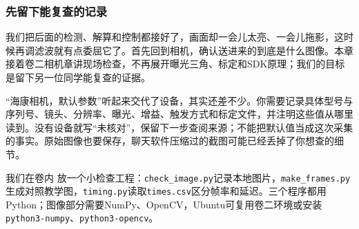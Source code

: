 \subsubsection{先留下能复查的记录}

我们把后面的检测、解算和控制都接好了，画面却一会儿太亮、一会儿拖影，这时候再调滤波就有点委屈它了。首先回到相机，确认送进来的到底是什么图像。本章接着卷二相机章讲现场检查，不再展开曝光三角、标定和SDK原理；我们的目标是留下另一位同学能复查的证据。

“海康相机，默认参数”听起来交代了设备，其实还差不少。你需要记录具体型号与序列号、镜头、分辨率、曝光、增益、触发方式和标定文件，并注明这些值从哪里读到。没有设备就写“未核对”，保留下一步查阅来源；不能把默认值当成这次采集的事实。原始图像也要保存，聊天软件压缩过的截图可能已经丢掉了你想查的细节。

我们在卷内  放一个小检查工程：\texttt{check\_image.py}记录本地图片，\texttt{make\_frames.py}生成对照教学图，\texttt{timing.py}读取\texttt{times.csv}区分帧率和延迟。三个程序都用Python；图像部分需要NumPy、OpenCV，Ubuntu可复用卷二环境或安装\texttt{python3-numpy}、\texttt{python3-opencv}。

